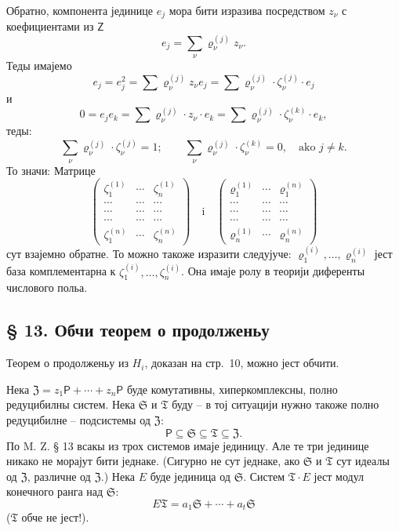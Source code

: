 \documentclass[11pt]{article}
\begin{document}
Обратно, компонента јединице \(e_j\) мора бити изразива посредством \(z_\nu\) с коефициентами из \(\mathsf Z\)
\[
e_j=\sum_\nu \varrho_\nu^{(j)}z_\nu .
\]
Теды имајемо
\[
e_j=e_j^2=\sum \varrho_\nu^{(j)}z_\nu e_j
=\sum \varrho_\nu^{(j)}\cdot\zeta_\nu^{(j)}\cdot e_j
\]
и
\[
0=e_je_k=\sum \varrho_\nu^{(j)}\cdot z_\nu\cdot e_k
=\sum \varrho_\nu^{(j)}\cdot\zeta_\nu^{(k)}\cdot e_k,
\]
теды:
\[
\sum_\nu \varrho_\nu^{(j)}\cdot\zeta_\nu^{(j)}=1;
\qquad
\sum_\nu \varrho_\nu^{(j)}\cdot\zeta_\nu^{(k)}=0,\quad
\text{ako } j\ne k.
\]
То значи: Матрице
\[
\begin{pmatrix}
\zeta_1^{(1)} & \cdots & \zeta_n^{(1)}\\
\cdots & \cdots & \cdots\\
\cdots & \cdots & \cdots\\
\cdots & \cdots & \cdots\\
\zeta_1^{(n)} & \cdots & \zeta_n^{(n)}
\end{pmatrix}
\quad\text{i}\quad
\begin{pmatrix}
\varrho_1^{(1)} & \cdots & \varrho_1^{(n)}\\
\cdots & \cdots & \cdots\\
\cdots & \cdots & \cdots\\
\cdots & \cdots & \cdots\\
\varrho_n^{(1)} & \cdots & \varrho_n^{(n)}
\end{pmatrix}
\]
сут взајемно обратне. То можно такоже изразити следујуче: \(\varrho_1^{(i)},\ldots,\varrho_n^{(i)}\) јест база комплементарна к \(\zeta_1^{(i)},\ldots,\zeta_n^{(i)}\). Она имаје ролу в теорији диференты числового польа.

\subsection*{§ 13. Обчи теорем о продолженьу}\label{der-allgemeine-fortsetzungssatz}

Теорем о продолженьу из \(H_i\), доказан на стр.~10, можно јест обчити.

Нека \(\mathfrak Z=z_1\mathsf P+\cdots+z_n\mathsf P\) буде комутативны, хиперкомплексны, полно редуцибилны систем. Нека \(\mathfrak S\) и \(\mathfrak T\) буду -- в тој ситуацији нужно такоже полно редуцибилне -- подсистемы од \(\mathfrak Z\):
\[
\mathsf P\subseteq\mathfrak S\subseteq\mathfrak T\subseteq\mathfrak Z .
\]
По M. Z. § 13 всакы из трох системов имаје јединицу. Але те три јединице никако не морајут бити једнаке. (Сигурно не сут једнаке, ако \(\mathfrak S\) и \(\mathfrak T\) сут идеалы од \(\mathfrak Z\), различне од \(\mathfrak Z\).) Нека \(E\) буде јединица од \(\mathfrak S\). Систем \(\mathfrak T\cdot E\) јест модул конечного ранга над \(\mathfrak S\):
\[
E\mathfrak T=a_1\mathfrak S+\cdots+a_t\mathfrak S
\]
(\(\mathfrak T\) обче не јест!).
\end{document}
